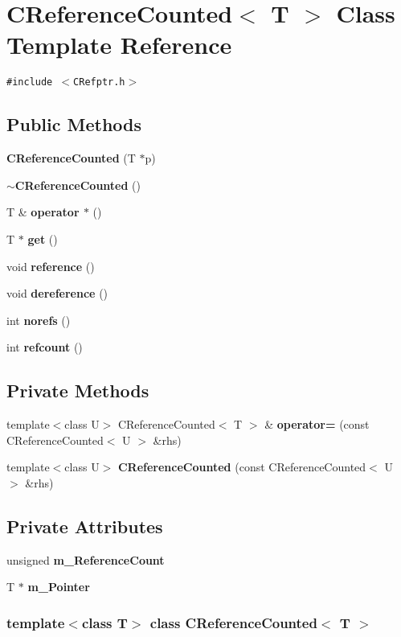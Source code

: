 \section{CReference\-Counted$<$ T $>$  Class Template Reference}
\label{classCReferenceCounted}
{\tt \#include $<$CRefptr.h$>$}

\subsection*{Public Methods}
\begin{CompactItemize}
\item 
{\bf CReference\-Counted} (T $\ast$p)
\item 
{\bf $\sim$CReference\-Counted} ()
\item 
T \& {\bf operator $\ast$} ()
\item 
T $\ast$ {\bf get} ()
\item 
void {\bf reference} ()
\item 
void {\bf dereference} ()
\item 
int {\bf norefs} ()
\item 
int {\bf refcount} ()
\end{CompactItemize}
\subsection*{Private Methods}
\begin{CompactItemize}
\item 
template$<$class U$>$ CReference\-Counted$<$ T $>$ \& {\bf operator=} (const CReference\-Counted$<$ U $>$ \&rhs)
\item 
template$<$class U$>$ {\bf CReference\-Counted} (const CReference\-Counted$<$ U $>$ \&rhs)
\end{CompactItemize}
\subsection*{Private Attributes}
\begin{CompactItemize}
\item 
unsigned {\bf m\_\-Reference\-Count}
\item 
T $\ast$ {\bf m\_\-Pointer}
\end{CompactItemize}
\subsubsection*{template$<$class T$>$ class CReference\-Counted$<$ T $>$}



